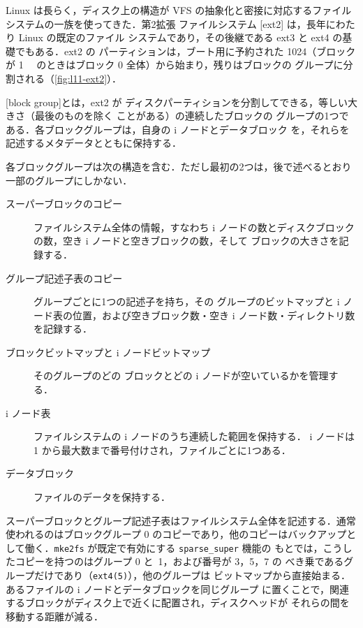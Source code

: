 \documentclass[../main.tex]{subfiles}
\begin{document}
Linux は長らく，ディスク上の構造が VFS の抽象化と密接に対応するファイル
システムの一族を使ってきた．第2拡張
ファイルシステム [ext2] は，長年にわたり Linux の既定のファイル
システムであり，その後継である ext3 と ext4 の基礎でもある．ext2 の
パーティションは，ブート用に予約された \SI{1024}{\byte}（ブロックが
\SI{1}{\kibi\byte} のときはブロック 0 全体）から始まり，残りはブロックの
グループに分割される（\cref{fig:l11-ext2}）．

\begin{definition}[ブロックグループ]
  [block group]とは，ext2 が
  ディスクパーティションを分割してできる，等しい大きさ（最後のものを除く
  ことがある）の連続したブロックの
  グループの1つである．各ブロックグループは，自身の i ノードとデータブロック
  を，それらを記述するメタデータとともに保持する．
\end{definition}

各ブロックグループは次の構造を含む．ただし最初の2つは，後で述べるとおり
一部のグループにしかない．
\begin{description}
  \item[スーパーブロックのコピー] ファイルシステム全体の情報，すなわち
    i ノードの数とディスクブロックの数，空き i ノードと空きブロックの数，そして
    ブロックの大きさを記録する．
  \item[グループ記述子表のコピー] グループごとに1つの記述子を持ち，その
    グループのビットマップと i ノード表の位置，および空きブロック数・空き
    i ノード数・ディレクトリ数を記録する．
  \item[ブロックビットマップと i ノードビットマップ] そのグループのどの
    ブロックとどの i ノードが空いているかを管理する．
  \item[i ノード表] ファイルシステムの i ノードのうち連続した範囲を保持する．
    i ノードは 1 から最大数まで番号付けされ，ファイルごとに1つある．
  \item[データブロック] ファイルのデータを保持する．
\end{description}
スーパーブロックとグループ記述子表はファイルシステム全体を記述する．通常
使われるのはブロックグループ 0 のコピーであり，他のコピーはバックアップと
して働く．\texttt{mke2fs} が既定で有効にする \texttt{sparse\_super} 機能の
もとでは，こうしたコピーを持つのはグループ 0 と~1，および番号が 3，5，7 の
べき乗であるグループだけであり（\texttt{ext4(5)}），他のグループは
ビットマップから直接始まる．あるファイルの i ノードとデータブロックを同じグループ
に置くことで，関連するブロックがディスク上で近くに配置され，ディスクヘッドが
それらの間を移動する距離が減る．
\end{document}

